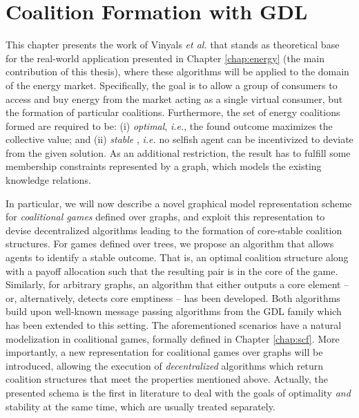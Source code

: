 \documentclass[11pt, twoside, titlepage, a4paper, openright]{report}
\begin{document}

\chapter{Coalition Formation with GDL}\label{chap:gdl}

This chapter presents the work of Vinyals {\em et al.} \cite{farinellirogers} that stands as theoretical base for the real-world application presented in Chapter \ref{chap:energy} (the main contribution of this thesis), where these algorithms will be applied to the domain of the energy market. Specifically, the goal is to allow a group of consumers to access and buy energy from the market acting as a single virtual consumer, but the formation of particular coalitions. Furthermore, the set of energy coalitions formed are required to be: (i) \textit{optimal}, \textit{i.e.}, the found outcome maximizes the collective value; and (ii) \textit{stable} \cite{RePEc:cla:levrem:814577000000000225}, \textit{i.e.} no selfish agent can be incentivized to deviate from the given solution. As an additional restriction, the result has to fulfill some membership constraints represented by a graph, which models the existing knowledge relations.

In particular, we will now describe a novel graphical model representation scheme for \textit{coalitional games} defined over graphs, and exploit this representation to devise decentralized algorithms leading to the formation of core-stable coalition structures. For games defined over trees, we propose an algorithm that allows agents to identify a stable outcome. That is, an optimal coalition structure along with a payoff allocation such that the resulting pair is in the core of the game. Similarly, for arbitrary graphs, an algorithm that either outputs a core element -- or, alternatively, detects core emptiness -- has been developed. Both algorithms build upon well-known message passing algorithms from the GDL family \cite{ecs21664,springerlink:10.1007/s10458-010-9132-7} which has been extended to this setting.
The aforementioned scenarios have a natural modelization in coalitional games, formally defined in Chapter \ref{chap:scf}. More importantly, a new representation for coalitional games over graphs will be introduced, allowing the execution of \textit{decentralized} algorithms which return coalition structures that meet the properties mentioned above. 
Actually, the presented schema is the first in literature to deal with the goals of optimality \textit{and} stability at the same time, which are usually treated separately.
\end{document}

